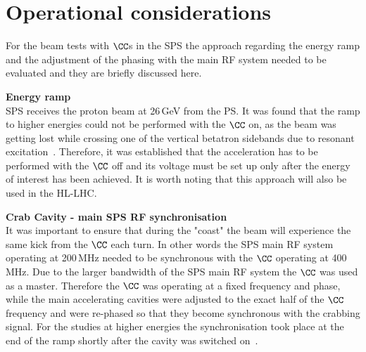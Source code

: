 
\section{Operational considerations}\label{sec:CC_operational_considerations}

For the beam tests with $\CC$s in the SPS the approach regarding the energy ramp and the adjustment of the phasing with the main RF system needed to be evaluated and they are briefly discussed here.

\normalsize{\textbf{Energy ramp}}\\
SPS receives the proton beam at 26\,GeV from the PS. It was found that the ramp to higher energies could not be performed with the $\CC$ on, as the beam was getting lost while crossing one of the vertical betatron sidebands due to resonant excitation~\cite{BE_seminar, CC_rephasing_RF}. Therefore, it was established that the acceleration has to be performed with the $\CC$ off and its voltage must be set up only after the energy of interest has been achieved. It is worth noting that this approach will also be used in the HL-LHC.

\normalsize{\textbf{Crab Cavity - main SPS RF synchronisation}}\\
It was important to ensure that during the "coast" the beam will experience the same kick from the $\CC$ each turn. In other words the SPS main RF system operating at 200\,MHz needed to be synchronous with the $\CC$ operating at 400\,MHz. Due to the larger bandwidth of the SPS main RF system the $\CC$ was used as a master. Therefore the $\CC$ was operating at a fixed frequency and phase, while the main accelerating cavities were adjusted to the exact half of the $\CC$ frequency and were re-phased so that they become synchronous with the crabbing signal. For the studies at higher energies the synchronisation took place at the end of the ramp shortly after the cavity was switched on~\cite{BE_seminar}.



